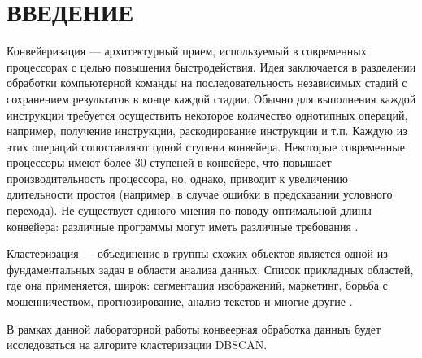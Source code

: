 {\centering \chapter*{ВВЕДЕНИЕ}}

Конвейеризация --- архитектурный прием, используемый в современных процессорах с целью повышения быстродействия.
Идея заключается в разделении обработки компьютерной команды на последовательность независимых стадий с сохранением результатов в конце каждой стадии.
Обычно для выполнения каждой инструкции требуется осуществить некоторое количество однотипных операций, например, получение инструкции, раскодирование инструкции и т.п. 
Каждую из этих операций сопоставляют одной ступени конвейера. 
Некоторые современные процессоры имеют более 30 ступеней в конвейере, что повышает производительность процессора, но, однако, приводит к увеличению длительности простоя (например, в случае ошибки в предсказании условного перехода).
Не существует единого мнения по поводу оптимальной длины конвейера: различные программы могут иметь различные требования \cite{conv}.

Кластеризация --- объединение в группы схожих объектов является одной из фундаментальных задач в области анализа данных.
Список прикладных областей, где она применяется, широк: сегментация изображений, маркетинг, борьба с мошенничеством, прогнозирование, анализ текстов и многие другие \cite{intro-2}.

В рамках данной лабораторной работы конвеерная обработка данныъ будет исследоваться на алгорите кластеризации DBSCAN.